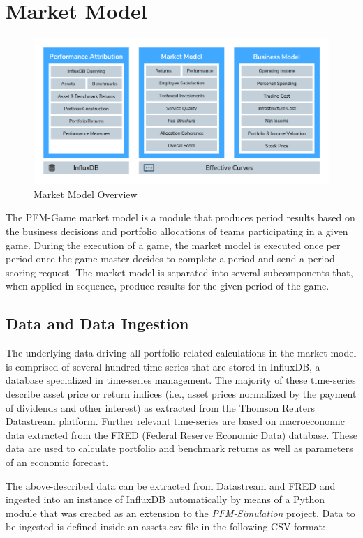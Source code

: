 \section{Market Model}

\begin{figure}[h!]
    \includegraphics[width=\textwidth]{img/market_model.png}
    \caption{Market Model Overview}
    \centering
    \label{fig:market_model_overview}
\end{figure}

The PFM-Game market model is a module that produces period results based on the business decisions and portfolio allocations of teams participating in a given game. During the execution of a game, the market model is executed once per period once the game master decides to complete a period and send a period scoring request. The market model is separated into several subcomponents that, when applied in sequence, produce results for the given period of the game.

\subsection{Data and Data Ingestion}
The underlying data driving all portfolio-related calculations in the market model is comprised of several hundred time-series that are stored in InfluxDB, a database specialized in time-series management. The majority of these time-series describe asset price or return indices (i.e., asset prices normalized by the payment of dividends and other interest) as extracted from the Thomson Reuters Datastream platform. Further relevant time-series are based on macroeconomic data extracted from the FRED (Federal Reserve Economic Data) database. These data are used to calculate portfolio and benchmark returns as well as parameters of an economic forecast.

The above-described data can be extracted from Datastream and FRED and ingested into an instance of InfluxDB automatically by means of a Python module that was created as an extension to the \textit{PFM-Simulation} project. Data to be ingested is defined inside an assets.csv file in the following CSV format:

